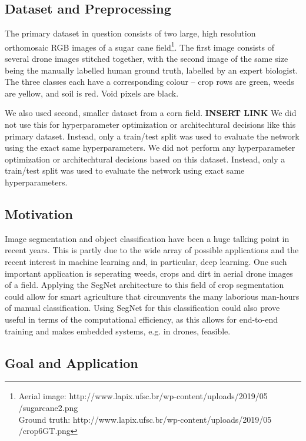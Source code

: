 \documentclass{article}
\begin{document}
\subsection{Dataset and Preprocessing}
The primary dataset in question consists of two large, high resolution orthomosaic RGB images of a sugar cane field\footnote{Aerial image: http://www.lapix.ufsc.br/wp-content/uploads/2019/05\\/sugarcane2.png\\
Ground truth: http://www.lapix.ufsc.br/wp-content/uploads/2019/05\\/crop6GT.png}.
The first image consists of several drone images stitched together, with the second image of the same size being the manually labelled human ground truth, labelled by an expert biologist.
The three classes each have a corresponding colour -- crop rows are green, weeds are yellow, and soil is red.
Void pixels are black.

We also used second, smaller dataset from a corn field. \textbf{INSERT LINK}
We did not use this for hyperparameter optimization or architechtural decisions like this primary dataset.
Instead, only a train/test split was used to evaluate the network using the exact same hyperparameters.
We did not perform any hyperparameter optimization or architechtural decisions based on this dataset.
Instead, only a train/test split was used to evaluate the network using exact same hyperparameters.

\subsection{Motivation}
Image segmentation and object classification have been a huge talking point in recent years. This is partly due to the wide array of possible applications and the recent interest in machine learning and, in particular, deep learning. One such important application is seperating weeds, crops and dirt in aerial drone images of a field. Applying the SegNet architecture to this field of crop segmentation could allow for smart agriculture that circumvents the many laborious man-hours of manual classification. Using SegNet for this classification could also prove useful in terms of the computational efficiency, as this allows for end-to-end training and makes embedded systems, e.g. in drones, feasible.

\subsection{Goal and Application}
\end{document}
